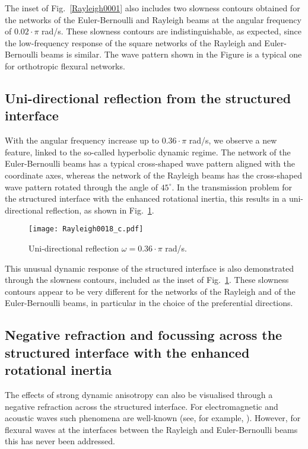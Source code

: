 \documentclass[11pt]{article}
\begin{document}
The inset of Fig.~\ref{Rayleigh0001} also includes two slowness contours obtained for the networks of the Euler-Bernoulli and Rayleigh beams at the angular frequency of $0.02\!\cdot\!\pi$ rad/s. These slowness contours are indistinguishable, as expected, since the low-frequency response of the square networks of the Rayleigh and Euler-Bernoulli beams is similar. The wave pattern shown in the Figure is a typical one for orthotropic flexural networks.

\subsection{Uni-directional reflection from the structured interface}

With the angular frequency increase up to $0.36\!\cdot\!\pi$ rad/s, we observe a new feature, linked to the so-called hyperbolic dynamic regime. The network of the Euler-Bernoulli beams has a typical cross-shaped wave pattern aligned with the coordinate axes, whereas the network of the Rayleigh beams has the cross-shaped wave pattern rotated through the angle of $45^\circ$. In the transmission problem for the structured interface with the enhanced rotational inertia, this results in a uni-directional reflection, as shown in Fig.~\ref{Rayleigh0018}.

\begin{figure}[!htb]
\centering
\texttt{[image: Rayleigh0018\_c.pdf]}
\caption{\footnotesize
Uni-directional reflection $\omega=0.36\!\cdot\!\pi$ rad/s.}
\label{Rayleigh0018}
\end{figure}

This unusual dynamic response of the structured interface is also demonstrated through the slowness contours, included as the inset of Fig.~\ref{Rayleigh0018}. These slowness contours appear to be very different for the networks of the Rayleigh and of the Euler-Bernoulli beams, in particular in the choice of the preferential directions.

\subsection{Negative refraction and focussing across the structured interface with the enhanced rotational inertia}

The effects of strong dynamic anisotropy can also be visualised through a negative refraction across the structured interface. For electromagnetic and acoustic waves such phenomena are well-known (see, for example, \cite{JBP, PSS, CG}). However, for flexural waves at the interfaces between the Rayleigh and Euler-Bernoulli beams this has never been addressed.
\end{document}
